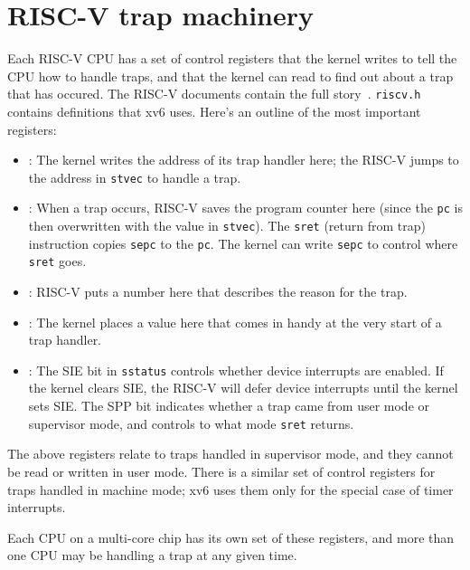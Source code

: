 \section{RISC-V trap machinery}

Each RISC-V CPU has a set of control registers that the kernel writes to
tell the CPU how to handle traps, and that the kernel can read
to find out about a trap that has occured. The RISC-V documents
contain the full story~\cite{riscv:priv}. {\tt riscv.h}
 contains definitions that xv6 uses. Here's
an outline of the most important registers:

\begin{itemize}

\item {}: The kernel writes the address of its trap handler
  here; the RISC-V jumps to the address in {\tt stvec} to handle a trap.

\item {}: When a trap occurs, RISC-V saves the program counter
  here (since the {\tt pc} is then overwritten with the
  value in {\tt stvec}). The
  {\tt sret} (return from trap) instruction copies {\tt sepc} to the
  {\tt pc}. The kernel can write {\tt sepc} to control where {\tt
    sret} goes.

\item {}: RISC-V puts a number here that describes
the reason for the trap.

\item {}: The kernel places a value here that comes in
  handy at the very start of a trap handler.

\item {}: The SIE bit in {\tt sstatus}
  controls whether device interrupts
  are enabled. If the kernel clears SIE, the RISC-V will defer
  device interrupts until the kernel sets SIE. The SPP bit
  indicates whether a trap came from user mode or supervisor
  mode, and controls to what mode {\tt sret} returns.

\end{itemize}

The above registers relate to traps handled in supervisor mode, and they
cannot be read or written in user mode. There is a similar set of
control registers for traps handled in machine mode; xv6 uses
them only for the special case of timer interrupts.

Each CPU on a multi-core chip has its own set of these registers,
and more than one CPU may be handling a trap at any given time.

